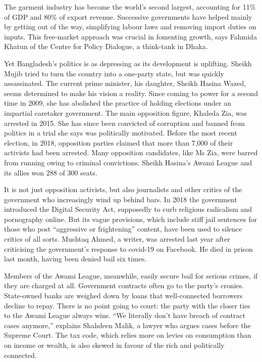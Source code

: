 \documentclass{article}
\begin{document}
The garment industry has become the world's second largest, accounting for 11\% of GDP and 80\% of export revenue. Successive governments have helped mainly by getting out of the way, simplifying labour laws and removing import duties on inputs. This free-market approach was crucial in fomenting growth, says Fahmida Khatun of the Centre for Policy Dialogue, a think-tank in Dhaka. 

Yet Bangladesh's politics is as depressing as its development is uplifting. Sheikh Mujib tried to turn the country into a one-party state, but was quickly assassinated. The current prime minister, his daughter, Sheikh Hasina Wazed, seems determined to make his vision a reality. Since coming to power for a second time in 2009, she has abolished the practice of holding elections under an impartial caretaker government. The main opposition figure, Khaleda Zia, was arrested in 2015. She has since been convicted of corruption and banned from politics in a trial she says was politically motivated. Before the most recent election, in 2018, opposition parties claimed that more than 7,000 of their activists had been arrested. Many opposition candidates, like Ms Zia, were barred from running owing to criminal convictions. Sheikh Hasina's Awami League and its allies won 288 of 300 seats. 

It is not just opposition activists, but also journalists and other critics of the government who increasingly wind up behind bars. In 2018 the government introduced the Digital Security Act, supposedly to curb religious radicalism and pornography online. But its vague provisions, which include stiff jail sentences for those who post ``aggressive or frightening'' content, have been used to silence critics of all sorts. Mushtaq Ahmed, a writer, was arrested last year after criticising the government's response to covid-19 on Facebook. He died in prison last month, having been denied bail six times. 

Members of the Awami League, meanwhile, easily secure bail for serious crimes, if they are charged at all. Government contracts often go to the party's cronies. State-owned banks are weighed down by loans that well-connected borrowers decline to repay. There is no point going to court: the party with the closer ties to the Awami League always wins. ``We literally don't have breach of contract cases anymore,'' explains Shahdeen Malik, a lawyer who argues cases before the Supreme Court. The tax code, which relies more on levies on consumption than on income or wealth, is also skewed in favour of the rich and politically connected. 
\end{document}
